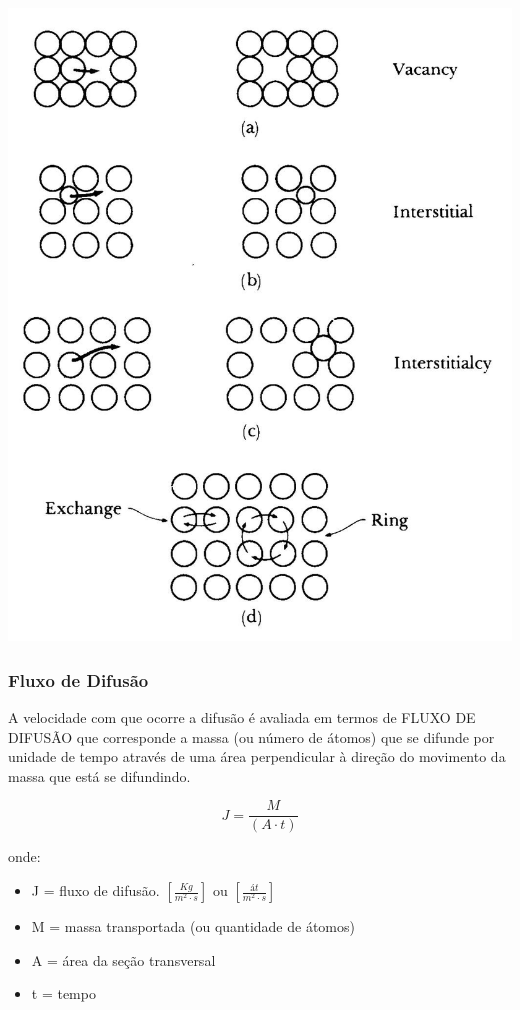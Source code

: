 \includegraphics[scale=0.3,trim={0 0 0 0}]{figures/difusao}


\subsubsection{Fluxo de Difusão}

A velocidade com que ocorre a difusão é avaliada em termos de FLUXO DE DIFUSÃO que corresponde a massa (ou número de átomos) que se difunde por unidade de tempo através de uma área perpendicular à direção do movimento da massa que está se difundindo.

\begin{equation}\label{key}
J = \frac{M}{(A \cdot t)}
\end{equation}

onde: 

\begin{itemize}
	\item J = fluxo de difusão. $[\frac{Kg}{m^{2} \cdot s}]$ ou $[\frac{át}{m^{2} \cdot s}]$
	\item M = massa transportada (ou quantidade de átomos)
	\item A = área da seção transversal
	\item t = tempo
\end{itemize}



